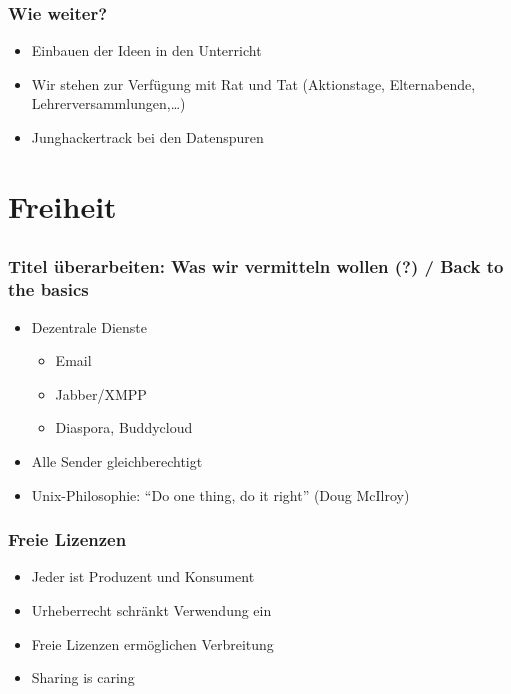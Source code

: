 \documentclass{beamer}
\begin{document}
\begin{frame}
  \frametitle{Wie weiter?}
  \begin{itemize}
    \item Einbauen der Ideen in den Unterricht
    \item Wir stehen zur Verfügung mit Rat und Tat (Aktionstage, Elternabende, Lehrerversammlungen,\ldots)
    \item Junghackertrack bei den Datenspuren
  \end{itemize}
\end{frame}

\section{Freiheit}
\subsection{}

\begin{frame}
  \frametitle{Titel überarbeiten: Was wir vermitteln wollen (?) / Back to the basics}
  \begin{itemize}
    \item<2-> Dezentrale Dienste
      \begin{itemize}
        \item<4-> Email
        \item<5-> Jabber/XMPP
        \item<6-> Diaspora, Buddycloud
      \end{itemize}
    \item<3-> Alle Sender gleichberechtigt
    \item<4-> Unix-Philosophie: "`Do one thing, do it right"' (Doug McIlroy)
  \end{itemize}
\end{frame}

\begin{frame}
  \frametitle{Freie Lizenzen}
  \begin{itemize}
    \item<2-> Jeder ist Produzent und Konsument
    \item<3-> Urheberrecht schränkt Verwendung ein
    \item<4-> Freie Lizenzen ermöglichen Verbreitung
    \item<5-> Sharing is caring
  \end{itemize}
\end{frame}
\end{document}
